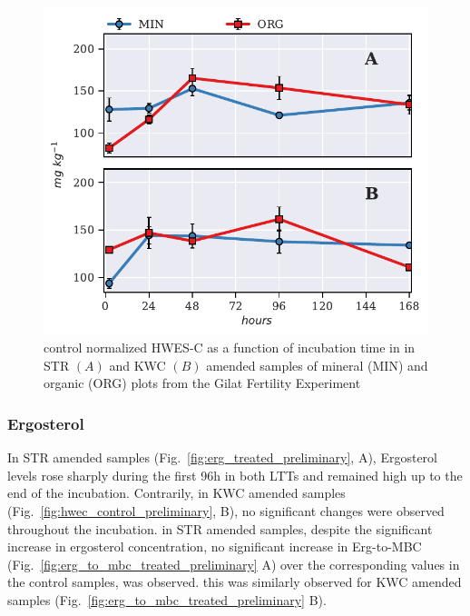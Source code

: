 			\begin{figure}[H]
				\centering
				\includegraphics[width=\linewidth]{thesis_figures/preliminary/control_normalized/HWES-C.pdf}
				\caption{control normalized HWES-C  as a function of incubation time in in STR $\left(A\right)$ and KWC $\left(B\right)$ amended samples of mineral (MIN) and organic (ORG) plots from the Gilat Fertility Experiment}
				\label{fig:nor_hwes-c_treated_preliminary}
			\end{figure}

		\subsubsection{Ergosterol}
			In STR amended samples (Fig.\ \ref{fig:erg_treated_preliminary}, A), Ergosterol levels rose sharply during the first 96h in both LTTs and remained high up to the end of the incubation. Contrarily, in KWC amended samples (Fig.\ \ref{fig:hwec_control_preliminary}, B), no significant changes were observed throughout the incubation. in STR amended samples, despite the significant increase in ergosterol concentration, no significant increase in Erg-to-MBC (Fig.\ \ref{fig:erg_to_mbc_treated_preliminary} A) over the corresponding values in the control samples, was observed. this was similarly observed for KWC amended samples (Fig.\ \ref{fig:erg_to_mbc_treated_preliminary} B).

